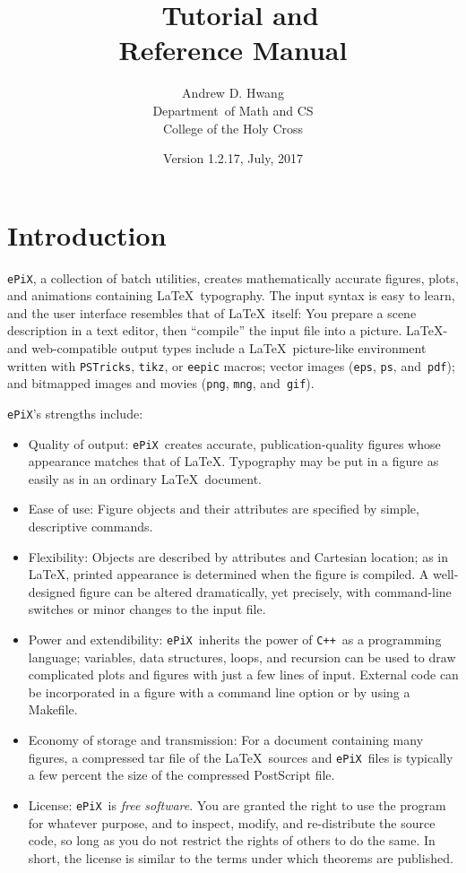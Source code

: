 \documentclass[12pt,letterpaper]{book}
\title{ \ePiX\ Tutorial and  \\ Reference Manual}
\author{Andrew D. Hwang \\ 
  Department\ of Math and CS \\ 
  College of the Holy Cross}
\date{Version 1.2.17, July, 2017}
\newcommand{\code}[1]{\texttt{#1}}
\newcommand{\ePiX}{\code{ePiX}}
\newcommand{\CXX}{\code{C++}}
\newcommand{\texinfochapter}[2]{\chapter{#2}}
\begin{document}
\maketitle

\tableofcontents

\texinfochapter{1}{Introduction}

\ePiX, a collection of batch utilities, creates mathematically
accurate figures, plots, and animations containing \LaTeX\ typography.
The input syntax is easy to learn, and the user interface resembles
that of \LaTeX\ itself: You prepare a scene description in a text
editor, then ``compile'' the input file into a picture. \LaTeX- and
web-compatible output types include a \LaTeX\ picture-like environment
written with \code{PSTricks}, \code{tikz}, or \code{eepic} macros;
vector images (\code{eps}, \code{ps}, and~\code{pdf}); and bitmapped
images and movies (\code{png}, \code{mng}, and~\code{gif}).

\ePiX's strengths include:
 
\begin{itemize}
\item Quality of output: \ePiX\ creates accurate, publication-quality
  figures whose appearance matches that of \LaTeX.  Typography may be
  put in a figure as easily as in an ordinary \LaTeX\ document.
  
\item Ease of use: Figure objects and their attributes are specified
  by simple, descriptive commands.
  
\item Flexibility: Objects are described by attributes and Cartesian
  location; as in \LaTeX, printed appearance is determined when the
  figure is compiled. A well-designed figure can be altered
  dramatically, yet precisely, with command-line switches or minor
  changes to the input file.
  
\item Power and extendibility: \ePiX\ inherits the power of \CXX\ as a
  programming language; variables, data structures, loops, and
  recursion can be used to draw complicated plots and figures with
  just a few lines of input. External code can be incorporated in a
  figure with a command line option or by using a Makefile.
  
\item Economy of storage and transmission: For a document containing
  many figures, a compressed tar file of the \LaTeX\ sources and
  \ePiX\ files is typically a few percent the size of the compressed
  PostScript file.
  
\item License: \ePiX\ is \emph{free software}.
  You are granted the right to use the program for whatever purpose,
  and to inspect, modify, and re-distribute the source code, so long
  as you do not restrict the rights of others to do the same. In
  short, the license is similar to the terms under which theorems are
  published.

\end{itemize}
\end{document}
